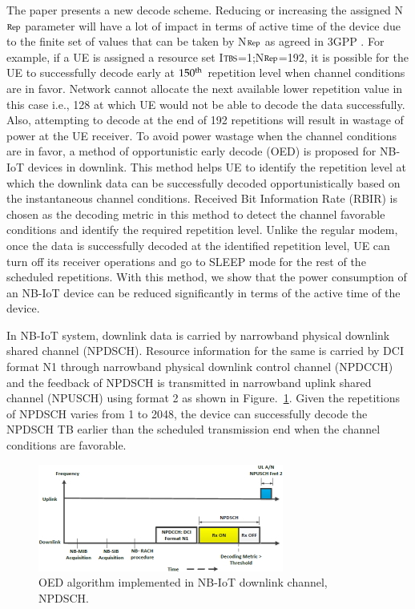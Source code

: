 \begin{multicols}{2}
The paper \cite{art1-key28} presents a new decode scheme. Reducing or increasing the assigned N$\scriptsize{\text{Rep}}$ parameter will have a lot of impact in terms of active time of the device due to the finite set of values that can be taken by N$\scriptsize{\text{Rep}}$ as agreed in 3GPP \cite{art1-key27}. For example, if a UE is assigned a resource set I$\scriptsize{\text{TBS}}$=1;N$\scriptsize{\text{Rep}}$=192, it is possible for the UE to successfully decode early at $150^{\scriptsize{\text{th}}}$ repetition level when channel conditions are in favor. Network cannot allocate the next available lower repetition value in this case i.e., 128 at which UE would not be able to decode the data successfully. Also, attempting to decode at the end of 192 repetitions will result in wastage of power at the UE receiver. To avoid power wastage when the channel conditions are in favor, a method of opportunistic early decode (OED) is proposed for NB-IoT devices in downlink. This method helps UE to identify the repetition level at which the downlink data can be successfully decoded opportunistically based on the instantaneous channel conditions. Received Bit Information Rate (RBIR) is chosen as the decoding metric in this method to detect the channel favorable conditions and identify the required repetition level. Unlike the regular modem, once the data is successfully decoded at the identified repetition level, UE can turn off its receiver operations and go to SLEEP mode for the rest of the scheduled repetitions. With this method, we show that the power consumption of an NB-IoT device can be reduced significantly in terms of the active time of the device. 

In NB-IoT system, downlink data is carried by narrowband physical downlink shared channel (NPDSCH). Resource information for the same is carried by DCI format N1 through narrowband physical downlink control channel (NPDCCH) and the feedback of NPDSCH is transmitted in narrowband uplink shared channel (NPUSCH) using format 2 as shown in Figure.~\ref{chap1-fig08}. Given the repetitions of NPDSCH varies from 1 to 2048, the device can successfully decode the NPDSCH TB earlier than the scheduled transmission end when the channel conditions are favorable.

\begin{figure}[H]
\centering
\includegraphics[scale=2.6]{src/Figures/chap1/chap1-fig08.jpg}
\caption{OED algorithm implemented in NB-IoT downlink channel, NPDSCH.}\label{chap1-fig08}
\end{figure}


\end{multicols}
